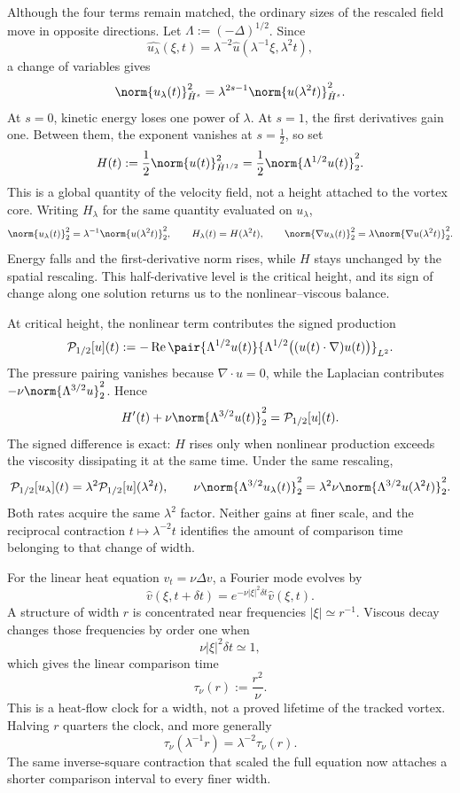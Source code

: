 Although the four terms remain matched, the ordinary sizes of the rescaled field move in opposite directions. Let $\Lambda:=(-\Delta)^{1/2}$. Since
\[
  \widehat{u_\lambda}(\xi,t)
  =
  \lambda^{-2}\widehat u(\lambda^{-1}\xi,\lambda^2t),
\]
a change of variables gives
\[
  \norm{u_\lambda(t)}_{\dot H^s}^2
  =
  \lambda^{2s-1}
  \norm{u(\lambda^2t)}_{\dot H^s}^2.
\]
At $s=0$, kinetic energy loses one power of $\lambda$. At $s=1$, the first derivatives gain one. Between them, the exponent vanishes at $s=\tfrac12$, so set
\[
  H(t)
  :=
  \frac12\norm{u(t)}_{\dot H^{1/2}}^2
  =
  \frac12\norm{\Lambda^{1/2}u(t)}_2^2.
\]
This is a global quantity of the velocity field, not a height attached to the vortex core. Writing $H_\lambda$ for the same quantity evaluated on $u_\lambda$,
\[
  \norm{u_\lambda(t)}_2^2
  =
  \lambda^{-1}\norm{u(\lambda^2t)}_2^2,
  \qquad
  H_\lambda(t)=H(\lambda^2t),
  \qquad
  \norm{\nabla u_\lambda(t)}_2^2
  =
  \lambda\norm{\nabla u(\lambda^2t)}_2^2.
\]
Energy falls and the first-derivative norm rises, while $H$ stays unchanged by the spatial rescaling. This half-derivative level is the critical height, and its sign of change along one solution returns us to the nonlinear--viscous balance.


At critical height, the nonlinear term contributes the signed production
\[
  \mathcal P_{1/2}[u](t)
  :=
  -\operatorname{Re}
  \pair
    {\Lambda^{1/2}u(t)}
    {\Lambda^{1/2}\bigl((u(t)\cdot\nabla)u(t)\bigr)}_{L^2}.
\]
The pressure pairing vanishes because $\nabla\cdot u=0$, while the Laplacian contributes $-\nu\norm{\Lambda^{3/2}u}_2^2$. Hence
\[
  H'(t)
  +
  \nu\norm{\Lambda^{3/2}u(t)}_2^2
  =
  \mathcal P_{1/2}[u](t).
\]
The signed difference is exact: $H$ rises only when nonlinear production exceeds the viscosity dissipating it at the same time. Under the same rescaling,
\[
  \mathcal P_{1/2}[u_\lambda](t)
  =
  \lambda^2\mathcal P_{1/2}[u](\lambda^2t),
  \qquad
  \nu\norm{\Lambda^{3/2}u_\lambda(t)}_2^2
  =
  \lambda^2\nu\norm{\Lambda^{3/2}u(\lambda^2t)}_2^2.
\]
Both rates acquire the same $\lambda^2$ factor. Neither gains at finer scale, and the reciprocal contraction $t\mapsto\lambda^{-2}t$ identifies the amount of comparison time belonging to that change of width.


For the linear heat equation $v_t=\nu\Delta v$, a Fourier mode evolves by
\[
  \widehat v(\xi,t+\delta t)
  =
  e^{-\nu|\xi|^2\delta t}\widehat v(\xi,t).
\]
A structure of width $r$ is concentrated near frequencies $|\xi|\simeq r^{-1}$. Viscous decay changes those frequencies by order one when
\[
  \nu|\xi|^2\delta t\simeq1,
\]
which gives the linear comparison time
\[
  \tau_\nu(r)
  :=
  \frac{r^2}{\nu}.
\]
This is a heat-flow clock for a width, not a proved lifetime of the tracked vortex. Halving $r$ quarters the clock, and more generally
\[
  \tau_\nu(\lambda^{-1}r)
  =
  \lambda^{-2}\tau_\nu(r).
\]
The same inverse-square contraction that scaled the full equation now attaches a shorter comparison interval to every finer width.

